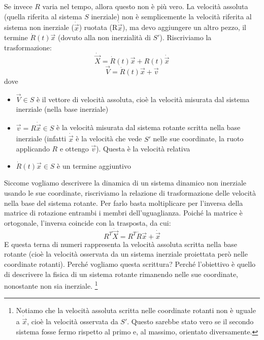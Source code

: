 \documentclass[a4paper,openany]{article}
\begin{document}
	Se invece $R$ varia nel tempo, allora questo non è più vero. La velocità assoluta (quella riferita al sistema $S$ inerziale) non è semplicemente la velocità riferita al sistema non inerziale ($\dot{\vec{x}}$) ruotata (R$\dot{\vec{x}}$), ma devo aggiungere un altro pezzo, il termine $\dot{R}(t)\vec{x}$ (dovuto alla non inerzialità di $S'$). Riscriviamo la trasformazione:
	$$
	\dot{\vec{X}} = \dot{R}(t)\vec{x} + R(t)\dot{\vec{x}}
	$$
	$$
	\vec{V} = \dot{R}(t)\vec{x} + \vec{v}
	$$ 
	dove \begin{itemize}
		\item $\vec{V}\in S$ è il vettore di velocità assoluta, cioè la velocità misurata dal sistema inerziale (nella base inerziale)
		\item $\vec{v} = R\dot{\vec{x}} \in S$ è la velocità misurata dal sistema rotante scritta nella base inerziale (infatti $\dot{\vec{x}}$ è la velocità che vede $S'$ nelle sue coordinate, la ruoto applicando $R$ e ottengo $\vec{v}$). Questa è la velocità relativa
		\item  $\dot{R}(t)\vec{x} \in S$ è un termine aggiuntivo
	\end{itemize}
	Siccome vogliamo descrivere la dinamica di un sistema dinamico non inerziale usando le sue coordinate, riscriviamo la relazione di trasformazione delle velocità nella base del sistema rotante. Per farlo basta moltiplicare per l'inversa della matrice di rotazione entrambi i membri dell'uguaglianza. Poiché la matrice è ortogonale, l'inversa coincide con la trasposta, da cui:
	\begin{equation}
		R^{T}\dot{\vec{X}} = R^{T}\dot{R}\vec{x} + \dot{\vec{x}}
		\label{VelAss}
	\end{equation}
	E questa terna di numeri rappresenta la velocità assoluta scritta nella base rotante (cioè la velocità osservata da un sistema inerziale proiettata però nelle coordinate rotanti). Perché vogliamo questa scrittura? Perché l'obiettivo è quello di descrivere la fisica di un sistema rotante rimanendo nelle sue coordinate, nonostante non sia inerziale.
	\footnote{Notiamo che la velocità assoluta scritta nelle coordinate rotanti non è uguale a $\dot{\vec{x}}$, cioè la velocità osservata da $S'$. Questo sarebbe stato vero se il secondo sistema fosse fermo rispetto al primo e, al massimo, orientato diversamente.}
	
\end{document}
